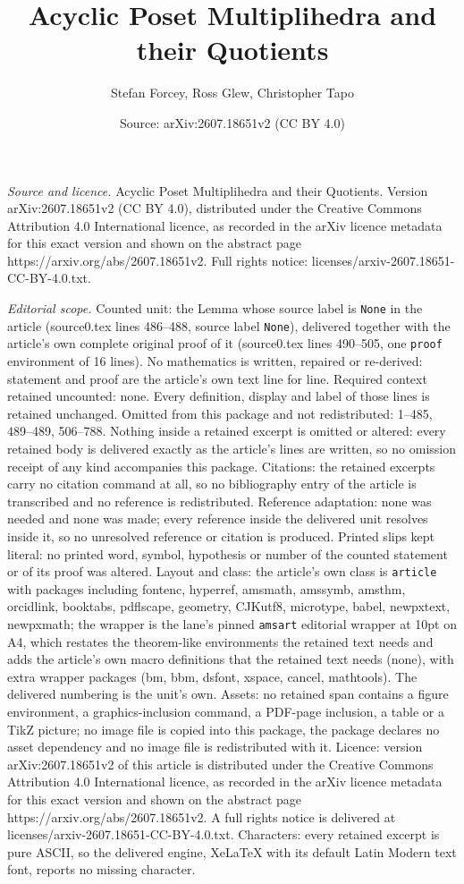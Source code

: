 \documentclass[10pt,a4paper]{amsart}
\title[Acyclic Poset Multiplihedra and their Quotients]{Acyclic Poset Multiplihedra and their Quotients}
\author{Stefan Forcey, Ross Glew, Christopher Tapo}
\date{Source: arXiv:2607.18651v2 (CC BY 4.0)}
\begin{document}
\maketitle

\noindent\emph{Source and licence.} Acyclic Poset Multiplihedra and their Quotients. Version arXiv:2607.18651v2 (CC BY 4.0), distributed under the Creative Commons Attribution 4.0 International licence, as recorded in the arXiv licence metadata for this exact version and shown on the abstract page https://arxiv.org/abs/2607.18651v2. Full rights notice: licenses/arxiv-2607.18651-CC-BY-4.0.txt.\par\smallskip

\noindent\textit{Editorial scope.} Counted unit: the Lemma whose source label is \texttt{None} in the article (source0.tex lines 486--488, source label \texttt{None}), delivered together with the article's own complete original proof of it (source0.tex lines 490--505, one \texttt{proof} environment of 16 lines). No mathematics is written, repaired or re-derived: statement and proof are the article's own text line for line. Required context retained uncounted: none. Every definition, display and label of those lines is retained unchanged. Omitted from this package and not redistributed: 1--485, 489--489, 506--788. Nothing inside a retained excerpt is omitted or altered: every retained body is delivered exactly as the article's lines are written, so no omission receipt of any kind accompanies this package. Citations: the retained excerpts carry no citation command at all, so no bibliography entry of the article is transcribed and no reference is redistributed. Reference adaptation: none was needed and none was made; every reference inside the delivered unit resolves inside it, so no unresolved reference or citation is produced. Printed slips kept literal: no printed word, symbol, hypothesis or number of the counted statement or of its proof was altered. Layout and class: the article's own class is \texttt{article} with packages including fontenc, hyperref, amsmath, amssymb, amsthm, orcidlink, booktabs, pdflscape, geometry, CJKutf8, microtype, babel, newpxtext, newpxmath; the wrapper is the lane's pinned \texttt{amsart} editorial wrapper at 10pt on A4, which restates the theorem-like environments the retained text needs and adds the article's own macro definitions that the retained text needs (none), with extra wrapper packages (bm, bbm, dsfont, xspace, cancel, mathtools). The delivered numbering is the unit's own. Assets: no retained span contains a figure environment, a graphics-inclusion command, a PDF-page inclusion, a table or a TikZ picture; no image file is copied into this package, the package declares no asset dependency and no image file is redistributed with it. Licence: version arXiv:2607.18651v2 of this article is distributed under the Creative Commons Attribution 4.0 International licence, as recorded in the arXiv licence metadata for this exact version and shown on the abstract page https://arxiv.org/abs/2607.18651v2. A full rights notice is delivered at licenses/arxiv-2607.18651-CC-BY-4.0.txt. Characters: every retained excerpt is pure ASCII, so the delivered engine, XeLaTeX with its default Latin Modern text font, reports no missing character.
\end{document}
